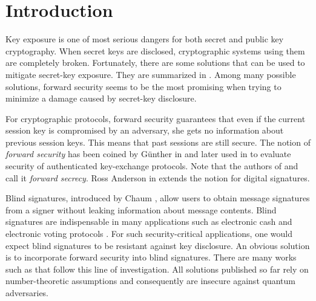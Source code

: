\documentclass[runningheads]{llncs}
\begin{document}
\section{Introduction}
%


Key exposure is one of most serious dangers for both secret and public key cryptography.
When secret keys are disclosed, cryptographic systems using them are completely broken.
Fortunately, there are some solutions that can be used to mitigate secret-key exposure.
They are summarized in \cite{BM99}.
Among many possible solutions, forward security seems to be the most promising when trying
to minimize a damage caused by secret-key disclosure.

For cryptographic protocols, 
forward security guarantees that even if the current session key is compromised by an adversary, 
she gets no information about previous session keys. 
This means that past sessions are still secure.
The notion of \textit{forward security} has been coined by G\"{u}nther in \cite{Gun90} and later used in  \cite{DOW92}
to evaluate security of authenticated key-exchange protocols.
Note that the authors of \cite{DOW92} and \cite{Gun90} call it \textit{forward secrecy}.
Ross Anderson in \cite{And02} extends the notion for digital signatures. 

Blind signatures, introduced by Chaum \cite{Chau83}, 
allow users to obtain message signatures from a signer without leaking information about message contents.
Blind signatures are indispensable in many applications such as 
electronic cash \cite[Section 1]{PS96} and electronic voting protocols \cite{Kuc10}.  
For such security-critical applications, one would expect blind signatures to be resistant against key disclosure.
An obvious solution is to incorporate forward security into blind signatures.
There are many works such as \cite{CHYC05,DCK03,JFC+10} that follow this line of investigation.
All solutions published so far rely on number-theoretic assumptions and consequently
are insecure against quantum adversaries.\\
\end{document}
